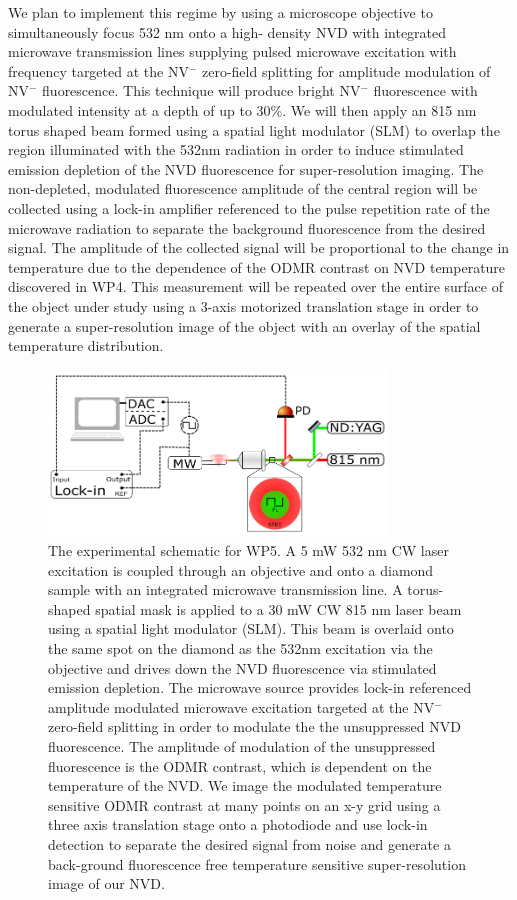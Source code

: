 \documentclass[11pt]{article}
\begin{document}
	We plan to implement this regime by using a microscope objective to simultaneously focus 532 nm onto a high-
density NVD with integrated microwave transmission lines supplying pulsed microwave excitation with frequency 
targeted at the NV$^-$ zero-field splitting for amplitude modulation of NV$^-$ fluorescence.  This technique 
will produce bright NV$^-$ fluorescence with modulated intensity at a depth of up to 30\%.  We will then apply 
an 815 nm torus shaped beam formed using a spatial light modulator (SLM) to overlap the region illuminated with the 532nm radiation in order to induce 
stimulated emission depletion of the NVD fluorescence for super-resolution imaging.  The non-depleted, modulated 
fluorescence amplitude of the central region will be collected using a lock-in amplifier referenced to the pulse 
repetition rate of the microwave radiation to separate the background fluorescence from the desired signal.  The 
amplitude of the collected signal will be proportional to the change in temperature due to the dependence of the 
ODMR contrast on NVD temperature discovered in WP4.  This measurement will be repeated over the entire surface 
of the object under study using a 3-axis motorized translation stage in order to generate a super-resolution 
image of the object with an overlay of the spatial temperature distribution. 

\begin{figure}
\centering
\includegraphics[width=0.8\textwidth]{Figures/WP5Schematic.png}
\caption{The experimental schematic for WP5.  A 5 mW 532 nm CW laser excitation is coupled through an objective and onto a diamond sample with an integrated microwave transmission line.  A torus-shaped spatial mask is applied to a 30 mW CW 815 nm laser beam using a spatial light modulator (SLM).  This beam is overlaid onto the same spot on the diamond as the 532nm excitation via the objective and drives down the NVD fluorescence via stimulated emission depletion.  The microwave source provides lock-in referenced amplitude modulated microwave excitation targeted at the NV$^-$ zero-field splitting in order to modulate the the unsuppressed NVD fluorescence.  The amplitude of modulation of the unsuppressed fluorescence is the ODMR contrast, which is dependent on the temperature of the NVD.  We image the modulated temperature sensitive ODMR contrast at many points on an x-y grid using a three axis translation stage onto a photodiode and use lock-in detection to separate the desired signal from noise and generate a back-ground fluorescence free temperature sensitive super-resolution image of our NVD.}
\label{WP5rSchematic}
\end{figure}
\end{document}
